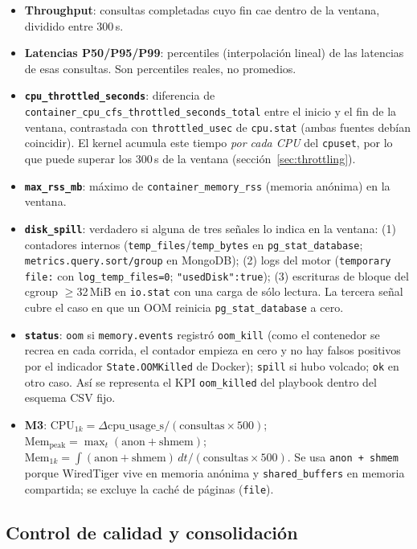 \documentclass[11pt,a4paper]{article}
\begin{document}
\begin{itemize}
  \item \textbf{Throughput}: consultas completadas cuyo fin cae dentro de la ventana, dividido entre 300\,s.
  \item \textbf{Latencias P50/P95/P99}: percentiles (interpolación lineal) de las latencias de esas consultas. Son percentiles reales, no promedios.
  \item \textbf{\texttt{cpu\_throttled\_seconds}}: diferencia de \texttt{container\_cpu\_cfs\_throttled\_seconds\_total} entre el inicio y el fin de la ventana, contrastada con \texttt{throttled\_usec} de \texttt{cpu.stat} (ambas fuentes debían coincidir). El kernel acumula este tiempo \emph{por cada CPU} del \texttt{cpuset}, por lo que puede superar los 300\,s de la ventana (sección~\ref{sec:throttling}).
  \item \textbf{\texttt{max\_rss\_mb}}: máximo de \texttt{container\_memory\_rss} (memoria anónima) en la ventana.
  \item \textbf{\texttt{disk\_spill}}: verdadero si alguna de tres señales lo indica en la ventana: (1) contadores internos (\texttt{temp\_files}/\texttt{temp\_bytes} en \texttt{pg\_stat\_database}; \texttt{metrics.query.sort/group} en MongoDB); (2) logs del motor (\texttt{temporary file:} con \texttt{log\_temp\_files=0}; \texttt{"usedDisk":true}); (3) escrituras de bloque del cgroup $\geq$32\,MiB en \texttt{io.stat} con una carga de sólo lectura. La tercera señal cubre el caso en que un OOM reinicia \texttt{pg\_stat\_database} a cero.
  \item \textbf{\texttt{status}}: \texttt{oom} si \texttt{memory.events} registró \texttt{oom\_kill} (como el contenedor se recrea en cada corrida, el contador empieza en cero y no hay falsos positivos por el indicador \texttt{State.OOMKilled} de Docker); \texttt{spill} si hubo volcado; \texttt{ok} en otro caso. Así se representa el KPI \texttt{oom\_killed} del playbook dentro del esquema CSV fijo.
  \item \textbf{M3}: $\text{CPU}_{1k} = \Delta\text{cpu\_usage\_s} / (\text{consultas} \times 500)$; $\text{Mem}_{\text{peak}} = \max_t(\text{anon}+\text{shmem})$; $\text{Mem}_{1k} = \int(\text{anon}+\text{shmem})\,dt / (\text{consultas} \times 500)$. Se usa \texttt{anon + shmem} porque WiredTiger vive en memoria anónima y \texttt{shared\_buffers} en memoria compartida; se excluye la caché de páginas (\texttt{file}).
\end{itemize}

\subsection{Control de calidad y consolidación}
\end{document}
